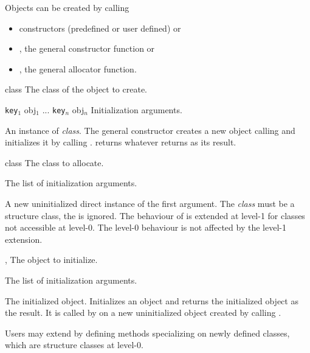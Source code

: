 \begin{optDefinition}
Objects can be created by calling
%
\begin{itemize}
    \item constructors (predefined or user defined) or
    \item {}, the general constructor function or
    \item {}, the general allocator function.
\end{itemize}

%
\begin{arguments}
    \item[class] The class of the object to create.
    \item[{\tt key$_1$} obj$_1$ ... {\tt key$_n$} obj$_n$] Initialization
    arguments.
\end{arguments}
%
\result%
An instance of {\em class}.
%
\remarks%
The general constructor  creates a new object calling
 and initializes it by calling
.  returns whatever
 returns as its result.

%
\begin{arguments}
    \item[class] The class to allocate.
    \item[\scref{initlist}] The list of initialization arguments.
\end{arguments}
%
\result%
A new uninitialized direct instance of the first argument.
%
\remarks%
The {\em class\/} must be a structure class, the  is ignored.
The behaviour of  is extended at level-1 for classes not
accessible at level-0. The level-0 behaviour is not affected by the
level-1 extension.

%
\begin{genericargs}
    \item[\scref{object}, \classref{object}] The object to initialize.
    \item[\scref{initlist}] The list of initialization arguments.
\end{genericargs}
%
\result%
The initialized object.
%
\remarks%
Initializes an object and returns the initialized object as the result.  It is
called by  on a new uninitialized object created by calling
.

Users may extend  by defining methods specializing on
newly defined classes, which are structure classes at level-0.


\end{optDefinition}
